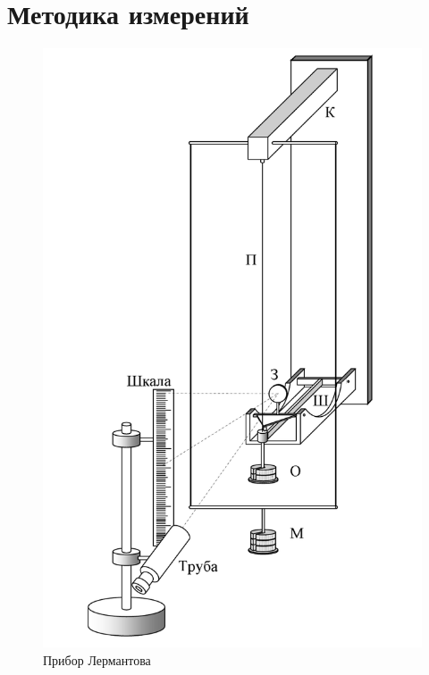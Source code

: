 \documentclass[12pt]{article}
\begin{document}
    \section{Методика измерений}
    \begin{figure}[H]
        \centering
        \includegraphics[scale = 0.35]{pictures/lermantov.png}
        \caption{Прибор Лермантова}
    \end{figure}
\end{document}

